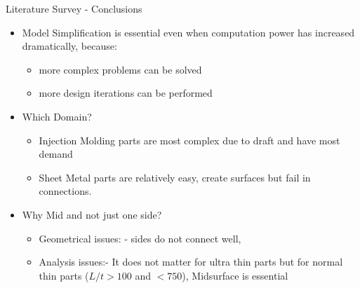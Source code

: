 \begin{frame}[<+-| alert@+>]{Literature Survey - Conclusions}
\begin{itemize}[noitemsep,label=\textbullet,topsep=2pt,parsep=2pt,partopsep=2pt]

\item Model Simplification is essential even when computation power has increased dramatically, because:
\begin{itemize}[noitemsep,label=\textbullet,topsep=2pt,parsep=2pt,partopsep=2pt]
\item more complex problems can be solved
\item more design iterations can be performed
\end{itemize}

\item Which Domain?
\begin{itemize}[noitemsep,label=\textbullet,topsep=2pt,parsep=2pt,partopsep=2pt]
\item Injection Molding parts are most complex due to draft and have most demand 
\item Sheet Metal parts are relatively easy, create surfaces but fail in connections. 
\end{itemize}

\item Why Mid and not just one side?
\begin{itemize}[noitemsep,label=\textbullet,topsep=2pt,parsep=2pt,partopsep=2pt]
\item Geometrical issues: - sides do not connect well, 
\item Analysis issues:- It does not matter for ultra thin parts but for normal thin parts ($L/t > 100$ and $< 750$), Midsurface is essential
\end{itemize}

\end{itemize}


\end{frame}



